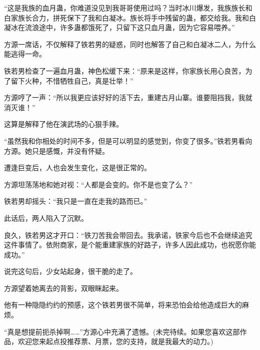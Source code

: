 \begin{this_body}
“这是我族的血月蛊，你难道没见到我哥哥使用过吗？当时冰川爆发，我族族长和白家族长合力，拼死保下了我和白凝冰。族长将手中残留的蛊，都交给我。我和白凝冰在流浪途中，许多蛊都饿死了，只留下这只血月蛊，因为它容易喂养。”

方源一席话，不仅解释了铁若男的疑惑，同时也解答了自己和白凝冰二人，为什么能逃得一命。

铁若男检查了一遍血月蛊，神色松缓下来：“原来是这样，你家族长用心良苦，为了留下火种，不惜牺牲自己，真是壮举！”

方源哼了一声：“所以我更应该好好的活下去，重建古月山寨。谁要阻挡我，我就消灭谁！”

这算是解释了他在演武场的心狠手辣。

“虽然我和你相处的时间不多，但是可以明显的感觉到，你变了很多。”铁若男看向方源。她只是感慨，并没有怀疑。

遭逢巨变后，人也会发生变化，这是很正常的。

方源坦荡荡地和她对视：“人都是会变的。你不是也变了么？”

铁若男却摇头：“我只是一直在走我的路而已。”

此话后，两人陷入了沉默。

良久，铁若男这才开口：“铁刀苦我会带回去。我承诺，铁家今后也不会继续追究这件事情了。依附商家，是个能重建家族的好路子，许多人因此成功，也祝愿你能成功。”

说完这句后，少女站起身，很干脆的走了。

方源望着她离去的背影，双眼眯起来。

他有一种隐隐约约的预感，这个铁若男很不简单，将来恐怕会给他造成巨大的麻烦。

“真是想提前扼杀掉啊……”方源心中充满了遗憾。(未完待续。如果您喜欢这部作品，欢迎您来起点投推荐票、月票，您的支持，就是我最大的动力。)

\end{this_body}

